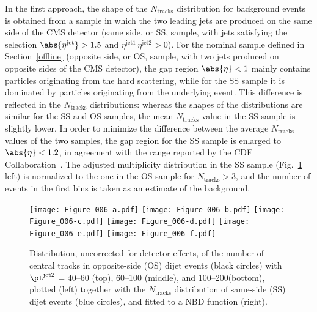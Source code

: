 \documentclass[11pt,twoside,a4paper,cmspaper,final,collab]{cms-tdr}
\begin{document}
In the first approach, the shape of the $N_\text{tracks}$ distribution for background events is obtained from a sample in which the two leading jets are produced on the same side of the CMS detector (same side, or SS, sample, with jets satisfying the selection $\abs{\eta^\text{jet}}> 1.5$  and $\eta^\mathrm{jet1} \, \eta^\text{jet2} > 0$).  For the nominal sample defined in Section~\ref{offline} (opposite side, or OS, sample, with two jets produced on opposite sides of the CMS detector), the gap region $\abs{\eta} < 1$ mainly contains particles originating from the hard scattering, while for the SS sample it is dominated by particles originating from the underlying event. This difference is reflected in the $N_\text{tracks}$ distributions: whereas the shapes of the distributions are similar for the SS and OS samples, the mean $N_\text{tracks}$ value in the SS sample is slightly lower. In order to minimize the difference between the average $N_\text{tracks}$ values of the two samples, the gap region for the SS sample is enlarged to  $\abs{\eta} < 1.2$, in agreement with the range reported by the CDF Collaboration~\cite{cdf3}. The adjusted multiplicity distribution in the SS sample (Fig.~\ref{ssnbd} left) is normalized to the one in the OS sample for $N_\text{tracks} > 3$, and the number of events in the first bins is taken as an estimate of the background.

\begin{figure*}[htbp]
\centering
\texttt{[image: Figure\_006-a.pdf]}
\texttt{[image: Figure\_006-b.pdf]}
\texttt{[image: Figure\_006-c.pdf]}
\texttt{[image: Figure\_006-d.pdf]}
\texttt{[image: Figure\_006-e.pdf]}
\texttt{[image: Figure\_006-f.pdf]}
\caption{Distribution, uncorrected for detector effects, of the number of central tracks in opposite-side (OS) dijet events (black circles) with $\pt^\text{jet2}$ = 40--60 (top), 60--100 (middle), and 100--200\GeV (bottom), plotted (left) together with the $N_\text{tracks}$ distribution of same-side (SS) dijet events (blue circles), and fitted to a NBD function (right).}
\label{ssnbd}
\end{figure*}
\end{document}
